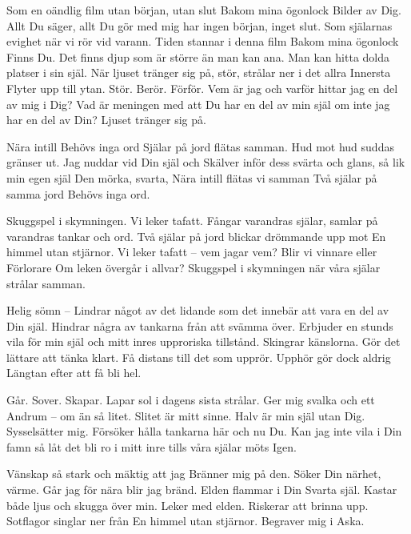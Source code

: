 Som en oändlig film utan början,
utan slut
Bakom mina ögonlock 
Bilder av Dig.
Allt Du säger, allt Du gör med mig
har ingen början, inget slut.
Som själarnas evighet
när vi rör vid varann.
Tiden stannar i denna film
Bakom mina ögonlock
Finns Du.
Det finns djup som är 
större än man kan ana.
Man kan hitta dolda platser i sin själ.
När ljuset tränger sig på,
stör, strålar ner i det allra
Innersta
Flyter upp till ytan.
Stör. Berör.
Förför.
Vem är jag och varför hittar jag
en del av mig i Dig?
Vad är meningen med att
Du har en del av min själ 
om inte jag har en del av Din?
Ljuset tränger sig på.
\stoppoem

\startpoem
Nära intill
Behövs inga ord
Själar på jord flätas samman.
Hud mot hud suddas gränser ut.
Jag nuddar vid Din själ och
Skälver inför dess svärta och glans,
så lik min egen själ
Den mörka, svarta,
Nära intill
flätas vi samman
Två själar på samma jord
Behövs inga ord.
\stoppoem

\startpoem
Skuggspel i skymningen.
Vi leker tafatt. 
Fångar varandras själar, 
samlar på varandras tankar och ord.
Två själar på jord
blickar drömmande upp mot
En himmel utan stjärnor.
Vi leker tafatt – 
vem jagar vem? 
Blir vi vinnare eller
Förlorare 
Om leken övergår i allvar?
Skuggspel i skymningen
när våra själar 
strålar samman.
\stoppoem

\startpoem
Helig sömn – 
Lindrar något av det lidande
som det innebär att vara en del av 
Din själ.
Hindrar några av tankarna från att
svämma över.
Erbjuder en stunds vila för min själ och
mitt inres upproriska tillstånd.
Skingrar känslorna.
Gör det lättare att tänka klart.
Få distans till det som upprör.
Upphör gör dock aldrig 
Längtan
efter att få bli hel.
\stoppoem

\startpoem
Går. Sover. Skapar.
Lapar sol i dagens sista strålar.
Ger mig svalka och ett
Andrum – om än så litet.
Slitet är mitt sinne.
Halv är min själ utan Dig.
Sysselsätter mig.
Försöker hålla tankarna här och nu
Du.
Kan jag inte vila i Din famn
så låt det bli ro 
i mitt inre
tills våra själar möts
Igen.
\stoppoem

\startpoem
Vänskap så stark och mäktig att jag
Bränner mig på den.
Söker Din närhet, värme.
Går jag för nära blir jag bränd.
Elden flammar i Din
Svarta själ.
Kastar både ljus och skugga över min.
Leker med elden.
Riskerar att brinna upp.
Sotflagor singlar ner från
En himmel utan stjärnor.
Begraver mig i 
Aska.
\stoppoem


